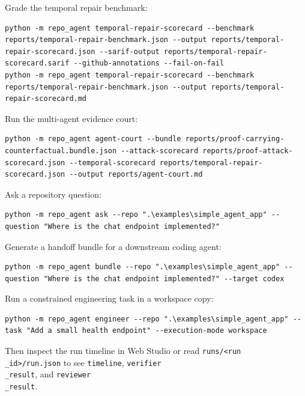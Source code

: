\documentclass[UTF8,12pt,openany]{ctexbook}
\begin{document}
Grade the temporal repair benchmark:\par

\begin{lstlisting}
python -m repo_agent temporal-repair-scorecard --benchmark reports/temporal-repair-benchmark.json --output reports/temporal-repair-scorecard.json --sarif-output reports/temporal-repair-scorecard.sarif --github-annotations --fail-on-fail
python -m repo_agent temporal-repair-scorecard --benchmark reports/temporal-repair-benchmark.json --output reports/temporal-repair-scorecard.md
\end{lstlisting}

Run the multi-agent evidence court:\par

\begin{lstlisting}
python -m repo_agent agent-court --bundle reports/proof-carrying-counterfactual.bundle.json --attack-scorecard reports/proof-attack-scorecard.json --temporal-scorecard reports/temporal-repair-scorecard.json --output reports/agent-court.md
\end{lstlisting}

Ask a repository question:\par

\begin{lstlisting}
python -m repo_agent ask --repo ".\examples\simple_agent_app" --question "Where is the chat endpoint implemented?"
\end{lstlisting}

Generate a handoff bundle for a downstream coding agent:\par

\begin{lstlisting}
python -m repo_agent bundle --repo ".\examples\simple_agent_app" --question "Where is the chat endpoint implemented?" --target codex
\end{lstlisting}

Run a constrained engineering task in a workspace copy:\par

\begin{lstlisting}
python -m repo_agent engineer --repo ".\examples\simple_agent_app" --task "Add a small health endpoint" --execution-mode workspace
\end{lstlisting}

Then inspect the run timeline in Web Studio or read \texttt{runs/<run\\_id>/run.json} to see \texttt{timeline}, \texttt{verifier\\_result}, and \texttt{reviewer\\_result}.\par
\end{document}
